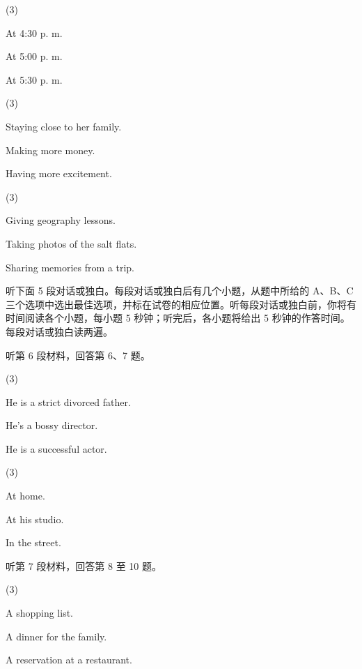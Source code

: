 \documentclass{英语试卷}
\begin{document}
\begin{choices}(3)
  \item At 4:30 p. m.
  \item At 5:00 p. m.
  \item At 5:30 p. m.
\end{choices}
\begin{choices}(3)
  \item Staying close to her family.
  \item Making more money.
  \item Having more excitement.
\end{choices}
\begin{choices}(3)
  \item Giving geography lessons.
  \item Taking photos of the salt flats.
  \item Sharing memories from a trip.
\end{choices}
\par 听下面 5 段对话或独白。每段对话或独白后有几个小题，从题中所给的 A、B、C 三个选项中选出最佳选项，并标在试卷的相应位置。听每段对话或独白前，你将有时间阅读各个小题，每小题 5 秒钟；听完后，各小题将给出 5 秒钟的作答时间。每段对话或独白读两遍。\par
\par 听第 6 段材料，回答第 6、7 题。\par
{}
\begin{choices}(3)
  \item He is a strict divorced father.
  \item He's a bossy director.
  \item He is a successful actor.
\end{choices}
\begin{choices}(3)
  \item At home.
  \item At his studio.
  \item In the street.
\end{choices}
\par 听第 7 段材料，回答第 8 至 10 题。\par
{}
\begin{choices}(3)
  \item A shopping list.
  \item A dinner for the family.
  \item A reservation at a restaurant.
\end{choices}
\end{document}
